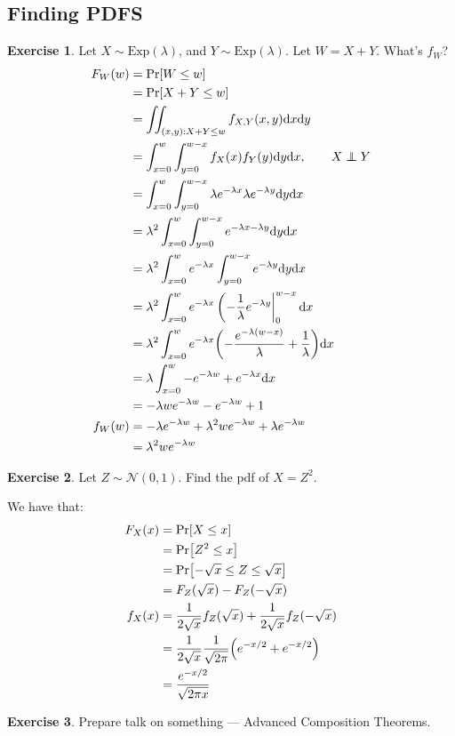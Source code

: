 \documentclass{article}
\theoremstyle{definition}
\newtheorem{exercise}{Exercise}[section]
\newcommand\independent{\protect\mathpalette{\protect\independenT}{\perp}}
\def\independenT#1#2{\mathrel{\rlap{$#1#2$}\mkern2mu{#1#2}}}
\begin{document}
\begin{itemize}
\section{Finding PDFS}
\begin{exercise}

Let $X\sim\text{Exp}(\lambda)$, and $Y\sim\text{Exp}(\lambda)$.
Let $W = X+Y$.
What's $f_W$?
\begin{align*}
F_W(w) &= \Pr[W \leq w] \\
& = \Pr[X+Y \leq w] \\
& = \iint_{(x,y):X+Y\leq w} f_{X,Y}(x,y)\dd x\dd y \\
& = \int_{x = 0}^w\int_{y = 0}^{w-x} f_X(x)f_Y(y)\dd y \dd x,\qquad X\independent Y \\
& = \int_{x = 0}^w\int_{y = 0}^{w-x} \lambda e^{-\lambda x}\lambda e^{-\lambda y}\dd y\dd x \\ 
& = \lambda^2\int_{x = 0}^w\int_{y = 0}^{w-x} e^{-\lambda x-\lambda y}\dd y\dd x \\
& = \lambda^2\int_{x = 0}^we^{-\lambda x}\int_{y = 0}^{w-x}e^{-\lambda y}\dd y\dd x \\
& = \lambda^2\int_{x = 0}^w e^{-\lambda x}\eval(-\frac{1}{\lambda}e^{-\lambda y}|_0^{w-x}\dd x \\
& = \lambda^2\int_{x = 0}^w e^{-\lambda x} \pqty{-\frac{e^{-\lambda(w-x)}}{\lambda} + \frac{1}{\lambda}}\dd x \\
& = \lambda\int_{x = 0}^w -e^{-\lambda w} + e^{-\lambda x}\dd x \\
& = -\lambda w e^{-\lambda w} -e^{-\lambda w}+1 \\
f_W(w) &= -\lambda e^{-\lambda w} + \lambda^2 we^{-\lambda w} +\lambda e^{-\lambda w} \\
& = \lambda^2 we^{-\lambda w}
\end{align*}
\end{exercise}
\begin{exercise}
Let $Z\sim\mathcal{N}(0,1)$.
Find the pdf of $X = Z^2$.

We have that:
\begin{align*}
F_X(x) &= \Pr[X \leq x] \\
& = \Pr[Z^2 \leq x] \\
& = \Pr[-\sqrt{x}\leq Z\leq \sqrt{x}] \\
& = F_Z(\sqrt{x}) - F_Z(-\sqrt{x}) \\
f_X(x) &= \frac{1}{2\sqrt{x}}f_Z(\sqrt{x}) + \frac{1}{2\sqrt{x}}f_Z(-\sqrt{x}) \\
& = \frac{1}{2\sqrt{x}}\frac{1}{\sqrt{2\pi}}\pqty{e^{-x/2} + e^{-x/2}} \\
& = \frac{e^{-x/2}}{\sqrt{2\pi x}}
\end{align*}
\end{exercise}
\end{itemize}
\newpage
\begin{exercise}
Prepare talk on something --- Advanced Composition Theorems.
\end{exercise}
\end{document}
